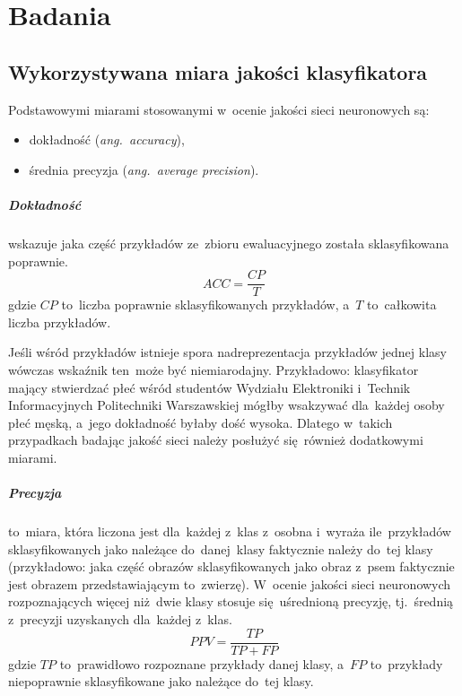 \chapter{Badania}
\section{Wykorzystywana miara jakości klasyfikatora}
Podstawowymi miarami stosowanymi w~ocenie jakości sieci neuronowych są:
\begin{itemize}
    \item dokładność (\textit{ang.~accuracy}),
    \item średnia precyzja (\textit{ang.~average precision}).
\end{itemize}

\paragraph{Dokładność} wskazuje jaka część przykładów ze~zbioru ewaluacyjnego została sklasyfikowana poprawnie.
\begin{equation*}
    ACC = \frac{CP}{T}
\end{equation*}
gdzie $CP$ to~liczba poprawnie sklasyfikowanych przykładów, a~$T$ to~całkowita liczba przykładów.

Jeśli wśród przykładów istnieje spora nadreprezentacja przykładów jednej klasy wówczas wskaźnik ten~może być
niemiarodajny. Przykładowo: klasyfikator mający stwierdzać płeć wśród studentów Wydziału Elektroniki i~Technik
Informacyjnych Politechniki Warszawskiej mógłby wsakzywać dla~każdej osoby płeć męską, a~jego dokładność byłaby
dość wysoka. Dlatego w~takich przypadkach badając jakość sieci należy posłużyć się~również dodatkowymi miarami.

\paragraph{Precyzja} to~miara, która liczona jest dla~każdej z~klas z~osobna i~wyraża ile~przykładów sklasyfikowanych
 jako należące do~danej~klasy faktycznie należy do~tej klasy (przykładowo: jaka część obrazów sklasyfikowanych jako
 obraz z~psem faktycznie jest obrazem przedstawiającym to~zwierzę). W~ocenie jakości sieci neuronowych rozpoznających
 więcej niż~dwie klasy stosuje się~uśrednioną precyzję, tj.~średnią z~precyzji uzyskanych dla~każdej z~klas.
 \begin{equation*}
    PPV = \frac{TP}{TP+FP}
\end{equation*}
gdzie $TP$ to~prawidłowo rozpoznane przykłady danej klasy, a~$FP$ to~przykłady niepoprawnie sklasyfikowane jako
 należące do~tej klasy.


